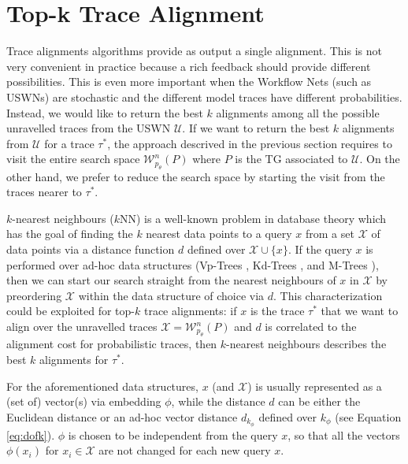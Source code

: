 \section{Top-k Trace Alignment}\label{sec:topk}
Trace alignments algorithms provide as output a single alignment. This is not very convenient in practice because a rich feedback should provide different possibilities. This is even more important when the Workflow Nets (such as USWNs) are stochastic and the different model traces have different probabilities. {Instead, we would like to return the best $k$ alignments among all the possible unravelled traces from the USWN $\mathcal{U}$. If we want to return the best $k$ alignments from $\mathcal{U}$ for a trace $\tau^*$, the approach descrived in the previous section requires to visit the entire search space $\mathcal{W}_{p_\theta}^n(P)$ where $P$ is the TG associated to $\mathcal{U}$. On the other hand, we prefer to reduce the search space by starting the visit from the traces nearer to $\tau^*$.}



$k$-nearest neighbours ($k$NN) is a well-known problem in database theory \cite{Altman} which has the goal of finding the $k$ nearest data points to a query $x$ from a set $\mathcal{X}$ of data points via a distance function $d$ defined over $\mathcal{X}\cup\{x\}$. {If the query  $x$ is performed over ad-hoc data structures (Vp-Trees \cite{Fu2000}, Kd-Trees \cite{Maneewongvatana99}, and M-Trees \cite{Ciaccia}), then we can start our search straight from the nearest neighbours of $x$ in $\mathcal{X}$ by preordering  $\mathcal{X}$ within the data structure of choice via $d$. This characterization could be exploited for top-$k$ trace alignments: if $x$ is the trace $\tau^*$ that we want to align over the unravelled traces $\mathcal{X}=\mathcal{W}^n_{p_\theta}(P)$ and $d$ is correlated to the alignment cost for probabilistic traces, then $k$-nearest neighbours describes the best $k$ alignments for  $\tau^*$.}
	
{For the aforementioned data structures, 
$x$ (and $\mathcal{X}$) is usually represented as a (set of) vector(s) via embedding  $\phi$, while the distance $d$ can be either the Euclidean distance or an ad-hoc vector distance $d_{k_\phi}$ defined over $k_\phi$ (see Equation \ref{eq:dofk}). $\phi$ is chosen to be independent from the query $x$, so that all the vectors $\phi(x_i)$ for $x_i\in\mathcal{X}$ are not changed for each new query $x$.}

